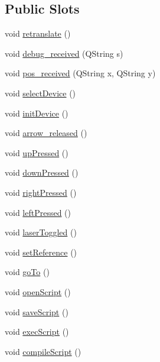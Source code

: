 \subsection*{Public Slots}
\begin{DoxyCompactItemize}
\item 
void \hyperlink{class_o_s_p_main_dialog_a47ea6fd9f98519cc31e72f5de34a9306}{retranslate} ()
\item 
void \hyperlink{class_o_s_p_main_dialog_a3e1eb9ec4e4b720c5710b6dd919cff2a}{debug\-\_\-received} (Q\-String s)
\item 
void \hyperlink{class_o_s_p_main_dialog_af8d49ae6630b09271fe3f3eecf083e75}{pos\-\_\-received} (Q\-String x, Q\-String y)
\item 
void \hyperlink{class_o_s_p_main_dialog_a4ef91ba4a5c2de748ae3863108f64ed1}{select\-Device} ()
\item 
void \hyperlink{class_o_s_p_main_dialog_ab70551cf5084beb1a448070784224b5e}{init\-Device} ()
\item 
void \hyperlink{class_o_s_p_main_dialog_a8d977df774af144d6b587874dc72bb6d}{arrow\-\_\-released} ()
\item 
void \hyperlink{class_o_s_p_main_dialog_a1d029fbbacb738ec5f96387afc4a148c}{up\-Pressed} ()
\item 
void \hyperlink{class_o_s_p_main_dialog_a2d9c9e8eadf0566c6a62b56c256d3036}{down\-Pressed} ()
\item 
void \hyperlink{class_o_s_p_main_dialog_add7447fb9aa1e92241e9dafb24be9eee}{right\-Pressed} ()
\item 
void \hyperlink{class_o_s_p_main_dialog_a53254f5a2f14008f0b28e599055db78c}{left\-Pressed} ()
\item 
void \hyperlink{class_o_s_p_main_dialog_a50277876272e2b18f4feaed7147805cb}{laser\-Toggled} ()
\item 
void \hyperlink{class_o_s_p_main_dialog_a440099805a95258b244578f44797b2fb}{set\-Reference} ()
\item 
void \hyperlink{class_o_s_p_main_dialog_a7f89737ac4e508e1149950f5ca3f62f7}{go\-To} ()
\item 
void \hyperlink{class_o_s_p_main_dialog_a81e34e4b686fc8a240b8b60fce8db716}{open\-Script} ()
\item 
void \hyperlink{class_o_s_p_main_dialog_a3a2279d534043892ce314ebd3676a946}{save\-Script} ()
\item 
void \hyperlink{class_o_s_p_main_dialog_a82deaf58658ee7df200d4c3ead6dc238}{exec\-Script} ()
\item 
void \hyperlink{class_o_s_p_main_dialog_a147004f47bd6872358d2a1503394df43}{compile\-Script} ()

\end{DoxyCompactItemize}
